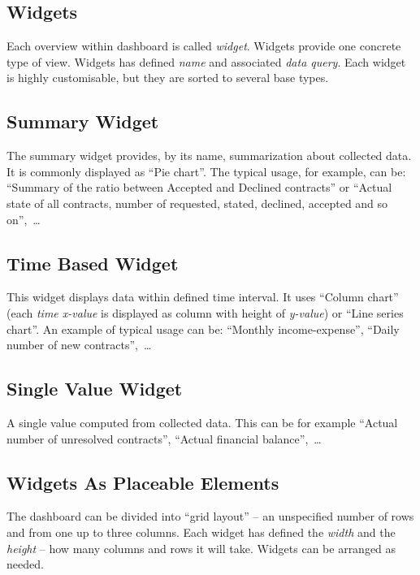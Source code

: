 \subsection{Widgets}
Each overview within dashboard is called \textit{widget}. Widgets provide one concrete type of view. Widgets has defined \textit{name} and associated \textit{data query}. Each widget is highly customisable, but they are sorted to several base types.
\subsection{Summary Widget}
The summary widget provides, by its name, summarization about collected data. It is commonly displayed as ``Pie chart''. The typical usage, for example, can be: ``Summary of the ratio between Accepted and Declined contracts'' or ``Actual state of all contracts, number of requested, stated, declined, accepted and so on'',~\dots
\subsection{Time Based Widget}
This widget displays data within defined time interval. It uses ``Column chart''  (each \textit{time x-value} is displayed as column with height of \textit{y-value}) or ``Line series chart''. An example of typical usage can be: ``Monthly income-expense'', ``Daily number of new contracts'',~\dots
\subsection{Single Value Widget}
A single value computed from collected data. This can be for example ``Actual number of unresolved contracts'', ``Actual financial balance'',~\dots 
\subsection{Widgets As Placeable Elements}
The dashboard can be divided into ``grid layout'' -- an unspecified number of rows and from one up to three columns. Each widget has defined the \textit{width} and the \textit{height} -- how many columns and rows it will take. Widgets can be arranged as needed. 

